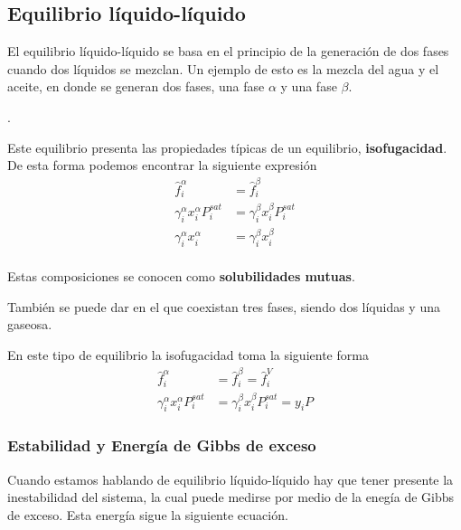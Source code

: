 \clearpage
\subsection{Equilibrio líquido-líquido}

El equilibrio líquido-líquido se basa en el principio de la generación de dos fases cuando dos líquidos se mezclan.
Un ejemplo de esto es la mezcla del agua y el aceite, en donde se generan dos fases, una fase $\alpha$ y una fase $\beta$.

.

Este equilibrio presenta las propiedades típicas de un equilibrio, \textbf{isofugacidad}. De esta forma podemos encontrar la siguiente expresión
\begin{align}
    \hat{f}_i^{\alpha}&=\hat{f}_i^{\beta}\\
    \gamma_i^{\alpha}x_i^{\alpha}P_i^{sat}&=\gamma_i^{\beta}x_i^{\beta}P_i^{sat}\\
    \gamma_i^{\alpha}x_i^{\alpha}&=\gamma_i^{\beta}x_i^{\beta}\\
\end{align}

Estas composiciones se conocen como \textbf{solubilidades mutuas}.

También se puede dar en el que coexistan tres fases, siendo dos líquidas y una gaseosa.

En este tipo de equilibrio la isofugacidad toma la siguiente forma
\begin{align}
    \hat{f}_i^{\alpha}&=\hat{f}_i^{\beta}=\hat{f}_i^{V}\\
    \gamma_i^{\alpha}x_i^{\alpha}P_i^{sat}&=\gamma_i^{\beta}x_i^{\beta}P_i^{sat}=y_iP
\end{align}

\subsubsection{Estabilidad y Energía de Gibbs de exceso}

Cuando estamos hablando de equilibrio líquido-líquido hay que tener presente la 
inestabilidad del sistema, la cual puede medirse por medio de la enegía de Gibbs de exceso.
Esta energía sigue la siguiente ecuación.



